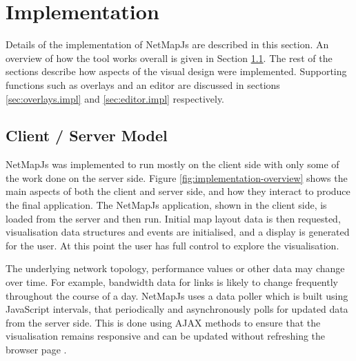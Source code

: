 \documentclass[11pt, a4paper]{article}
\begin{document}
\newpage

\section{Implementation} 
\label{sec:implementation}

Details of the implementation of NetMapJs are described in this section. An
overview of how the tool works overall is given in Section
\ref{sec:client-server-model.impl}. The rest of the sections describe how
aspects of the visual design were implemented. Supporting functions such as
overlays and an editor are discussed in sections \ref{sec:overlays.impl} and
\ref{sec:editor.impl} respectively.

\subsection{Client / Server Model}
\label{sec:client-server-model.impl}

NetMapJs was implemented to run mostly on the client side with only some of the
work done on the server side. Figure \ref{fig:implementation-overview} shows the
main aspects of both the client and server side, and how they interact to
produce the final application. The NetMapJs application, shown in the client
side, is loaded from the server and then run. Initial map layout data is then
requested, visualisation data structures and events are initialised, and a
display is generated for the user. At this point the user has full control to
explore the visualisation.

The underlying network topology, performance values or other data may change
over time. For example, bandwidth data for links is likely to change frequently
throughout the course of a day. NetMapJs uses a data poller which is built using
JavaScript intervals, that periodically and asynchronously polls for updated
data from the server side. This is done using AJAX methods to ensure that the
visualisation remains responsive and can be updated without refreshing the
browser page \cite{Paulson_2005}.
\end{document}
